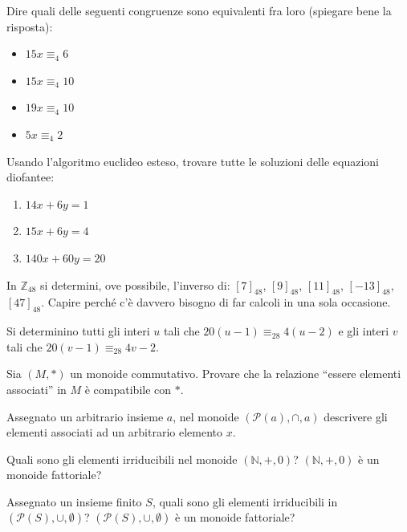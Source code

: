 \begin{exsbox}
	Dire quali delle seguenti congruenze sono equivalenti fra loro (spiegare bene la risposta):
	\begin{itemize}
		\item $15x \equiv_{4} 6$
		\item $15x \equiv_{4} 10$
		\item $19x \equiv_{4} 10$
		\item $5x \equiv_{4} 2$
	\end{itemize}
	
\end{exsbox}
\begin{exsbox}
	Usando l'algoritmo euclideo esteso, trovare tutte le soluzioni delle equazioni diofantee:
	\begin{enumerate}
		\item $14x+6y=1 $
		\item $15x+6y=4$
		\item $140x+60y=20$
	\end{enumerate}
\end{exsbox}
\begin{exsbox}
	In $\mathbb{Z}_{48}$ si determini, ove possibile, l'inverso di: $[7]_{48}$, $[9]_{48}$, $[11]_{48}$, $[-13]_{48}$, $[47]_{48}$. Capire perché c'è davvero bisogno di far calcoli in una sola occasione.
\end{exsbox}
\begin{exsbox}
	Si determinino tutti gli interi $u$ tali che $20(u-1) \equiv_{28} 4(u-2)$ e gli interi $v$ tali che $20(v-1) \equiv_{28} 4v-2$.
\end{exsbox}
\begin{exsbox}
	Sia $(M,\ast)$ un monoide commutativo. Provare che la relazione ``essere elementi associati'' in $M$ è compatibile con $\ast$.
\end{exsbox}
\begin{exsbox}
	Assegnato un arbitrario insieme $a$, nel monoide $(\mathcal{P}(a),\cap,a)$ descrivere gli elementi associati ad un arbitrario elemento $x$.
\end{exsbox}
\begin{exsbox}
	Quali sono gli elementi irriducibili nel monoide $(\mathbb{N},+,0)$? $(\mathbb{N},+,0)$ è un monoide fattoriale?
\end{exsbox}
\begin{exsbox}
	Assegnato un insieme finito $S$, quali sono gli elementi irriducibili in $(\mathcal{P}(S),\cup, \emptyset)$? $(\mathcal{P}(S),\cup, \emptyset)$ è un monoide fattoriale?
\end{exsbox}

